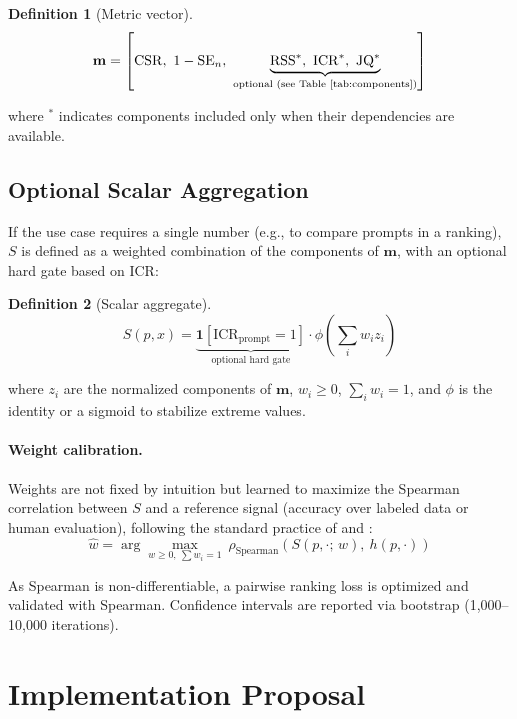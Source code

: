 \documentclass[11pt,a4paper]{article}
\newtheorem{definition}{Definition}
\begin{document}
\begin{definition}[Metric vector]
\[
\mathbf{m} = \left[\mathrm{CSR},\ 1 - \mathrm{SE}_n,\ \underbrace{\mathrm{RSS}^*,\ \mathrm{ICR}^*,\ \mathrm{JQ}^*}_{\text{optional (see Table~\ref{tab:components})}}\right]
\]
\end{definition}

\noindent where ${}^*$ indicates components included only when their dependencies are available.

\subsection{Optional Scalar Aggregation}

If the use case requires a single number (e.g., to compare prompts in a ranking), $S$ is defined as a weighted combination of the components of $\mathbf{m}$, with an optional hard gate based on ICR:

\begin{definition}[Scalar aggregate]
\[
S(p, x) = \underbrace{\mathbf{1}\left[\mathrm{ICR}_\mathrm{prompt} = 1\right]}_{\text{optional hard gate}} \cdot \phi\!\left(\sum_{i} w_i z_i\right)
\]
\end{definition}

\noindent where $z_i$ are the normalized components of $\mathbf{m}$, $w_i \geq 0$, $\sum_i w_i = 1$, and $\phi$ is the identity or a sigmoid to stabilize extreme values.

\paragraph{Weight calibration.}
Weights are not fixed by intuition but learned to maximize the Spearman correlation between $S$ and a reference signal (accuracy over labeled data or human evaluation), following the standard practice of \citet{glape2024} and \citet{geval2023}:
\[
\hat{w} = \arg\max_{w \geq 0,\ \sum w_i = 1}\ \rho_\mathrm{Spearman}\!\left(S(p, \cdot;\, w),\ h(p, \cdot)\right)
\]

As Spearman is non-differentiable, a pairwise ranking loss is optimized and validated with Spearman. Confidence intervals are reported via bootstrap (1{,}000--10{,}000 iterations).

\section{Implementation Proposal}
\end{document}
